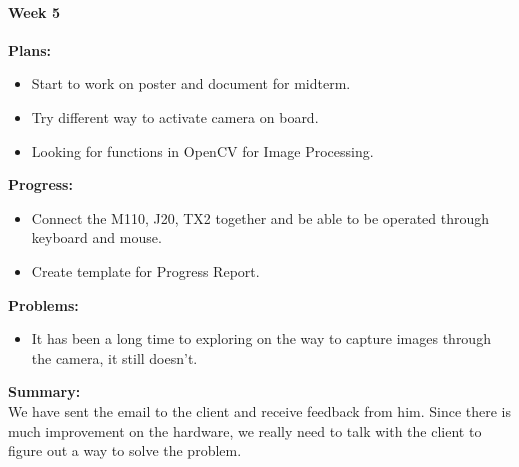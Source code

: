 \paragraph{Week 5}
\begin{adjustwidth}{2.5em}{0pt}
    \vspace{-0.5cm}\textbf{Plans:}
    \vspace{-0.5cm}
    \begin{itemize}
        \item Start to work on poster and document for midterm.
        \item Try different way to activate camera on board.
        \item Looking for functions in OpenCV for Image Processing.
    \end{itemize} 
    \vspace{-0.3cm}\textbf{Progress:}
    \vspace{-0.5cm}
    \begin{itemize}
        \item Connect the M110, J20, TX2 together and be able to be operated through keyboard and mouse.
        \item Create template for Progress Report.
    \end{itemize} 
    \vspace{-0.3cm}\textbf{Problems:}
    \vspace{-0.5cm}
    \begin{itemize}
        \item It has been a long time to exploring on the way to capture images through the camera, it still doesn't.
    \end{itemize}  
    \vspace{-0.3cm}\noindent\textbf{Summary:}\\
    \noindent We have sent the email to the client and receive feedback from him. Since there is much 
    improvement on the hardware, we really need to talk with the client to figure out a way to solve the problem. \\
\end{adjustwidth} 

